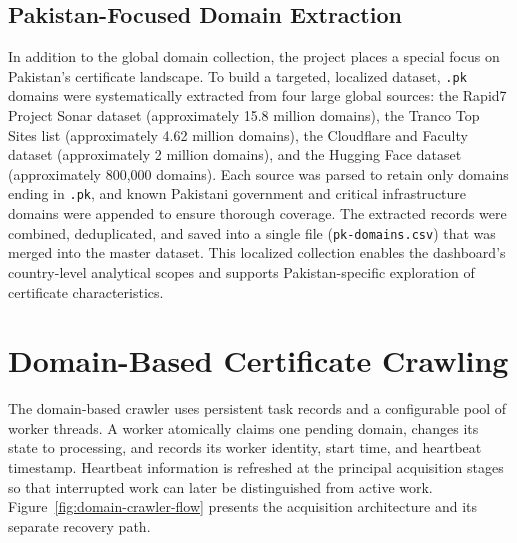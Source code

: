\subsection{Pakistan-Focused Domain Extraction}
\label{sec:pk-domain-extraction}

In addition to the global domain collection, the project places a special focus
on Pakistan's certificate landscape. To build a targeted, localized dataset,
\texttt{.pk} domains were systematically extracted from four large global
sources: the Rapid7 Project Sonar dataset (approximately 15.8 million domains),
the Tranco Top Sites list (approximately 4.62 million domains), the
Cloudflare and Faculty dataset (approximately 2 million domains), and the
Hugging Face dataset (approximately 800,000 domains). Each source was parsed to
retain only domains ending in \texttt{.pk}, and known Pakistani government and
critical infrastructure domains were appended to ensure thorough coverage. The
extracted records were combined, deduplicated, and saved into a single file
(\texttt{pk-domains.csv}) that was merged into the master dataset. This
localized collection enables the dashboard's country-level analytical scopes
and supports Pakistan-specific exploration of certificate characteristics.

\section{Domain-Based Certificate Crawling}
\label{sec:domain-crawler-architecture}

The domain-based crawler uses persistent task records and a configurable pool
of worker threads. A worker atomically claims one pending domain, changes its
state to processing, and records its worker identity, start time, and heartbeat
timestamp. Heartbeat information is refreshed at the principal acquisition
stages so that interrupted work can later be distinguished from active work.
Figure~\ref{fig:domain-crawler-flow} presents the acquisition architecture and
its separate recovery path.

